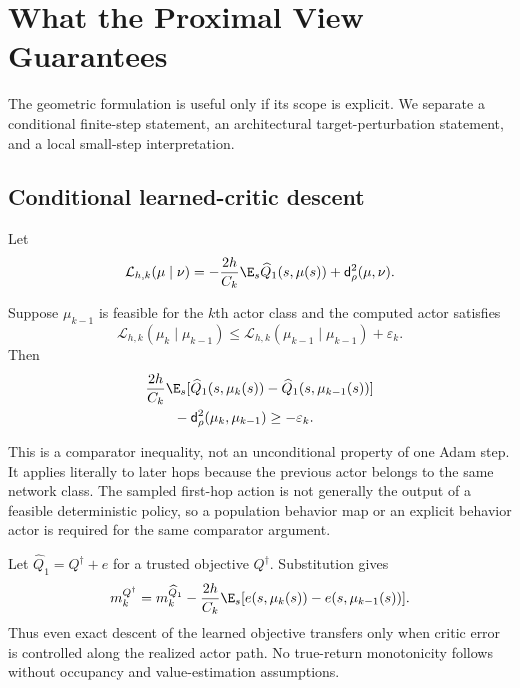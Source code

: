 \section{What the Proximal View Guarantees}
\label{sec:analysis}

The geometric formulation is useful only if its scope is explicit. We separate a conditional finite-step statement, an architectural target-perturbation statement, and a local small-step interpretation.

\subsection{Conditional learned-critic descent}

Let
\begin{equation}
 \mathcal L_{h,k}(\mu\mid\nu)
 =-\frac{2h}{C_k}\E_s\widehat Q_1(s,\mu(s))
 +\mathsf d_\rho^2(\mu,\nu).                                  \label{eq:proxloss_analysis}
\end{equation}

\begin{proposition}
\label{prop:conditional_descent}
Suppose $\mu_{k-1}$ is feasible for the $k$th actor class and the computed actor satisfies
\begin{equation*}
 \mathcal L_{h,k}(\mu_k\mid\mu_{k-1})
 \leq \mathcal L_{h,k}(\mu_{k-1}\mid\mu_{k-1})+\varepsilon_k.
\end{equation*}
Then
\begin{equation}
\begin{aligned}
 &\frac{2h}{C_k}\E_s[\widehat Q_1(s,\mu_k(s))
 -\widehat Q_1(s,\mu_{k-1}(s))]\\
 &\qquad-\mathsf d_\rho^2(\mu_k,\mu_{k-1})\geq-\varepsilon_k.
\end{aligned}\label{eq:conditional_descent}
\end{equation}
\end{proposition}

This is a comparator inequality, not an unconditional property of one Adam step. It applies literally to later hops because the previous actor belongs to the same network class. The sampled first-hop action is not generally the output of a feasible deterministic policy, so a population behavior map or an explicit behavior actor is required for the same comparator argument.

Let $\widehat Q_1=Q^\dagger+e$ for a trusted objective $Q^\dagger$. Substitution gives
\begin{equation}
 m_k^{Q^\dagger}=m_k^{\widehat Q_1}
 -\frac{2h}{C_k}\E_s[e(s,\mu_k(s))-e(s,\mu_{k-1}(s))].          \label{eq:error_transfer}
\end{equation}
Thus even exact descent of the learned objective transfers only when critic error is controlled along the realized actor path. No true-return monotonicity follows without occupancy and value-estimation assumptions.

